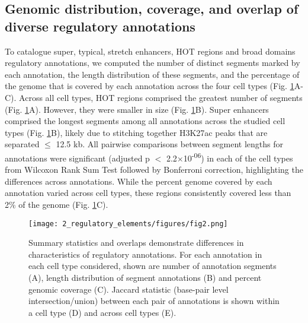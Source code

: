 \subsection{Genomic distribution, coverage, and overlap of diverse regulatory annotations}
To catalogue super, typical, stretch enhancers, HOT regions and broad domains regulatory annotations, we computed the number of distinct segments marked by each annotation, the length distribution of these segments, and the percentage of the genome that is covered by each annotation across the four cell types (Fig. \ref{fig:c1_f2}A-C). Across all cell types, HOT regions comprised the greatest number of segments (Fig. \ref{fig:c1_f2}A). However, they were smaller in size (Fig. \ref{fig:c1_f2}B). Super enhancers comprised the longest segments among all annotations across the studied cell types (Fig. \ref{fig:c1_f2}B), likely due to stitching together H3K27ac peaks that are separated $\leq$ 12.5 kb. All pairwise comparisons between segment lengths for annotations were significant (adjusted p $<$ 2.2$\times$10\textsuperscript{-06}) in each of the cell types from Wilcoxon Rank Sum Test followed by Bonferroni correction, highlighting the differences across annotations. While the percent genome covered by each annotation varied across cell types, these regions consistently covered less than 2\% of the genome (Fig. \ref{fig:c1_f2}C). \\

\begin{figure}
    \centering
    \texttt{[image: 2\_regulatory\_elements/figures/fig2.png]}
    \caption[Summary statistics and overlaps demonstrate differences in characteristics of regulatory annotations]{Summary statistics and overlaps demonstrate differences in characteristics of regulatory annotations. For each annotation in each cell type considered, shown are number of annotation segments (A), length distribution of segment annotations (B) and percent genomic coverage (C). Jaccard statistic (base-pair level intersection/union) between each pair of annotations is shown within a cell type (D) and across cell types (E).}
    \label{fig:c1_f2}
\end{figure}

